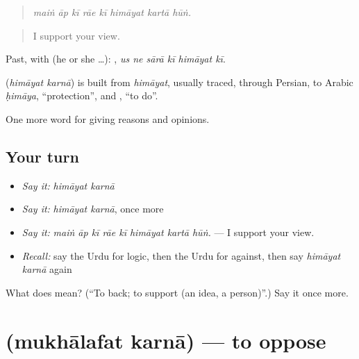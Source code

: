 \begin{quote}
\emph{maiṅ āp kī rāe kī himāyat kartā hūṅ.}
\end{quote}

\begin{quote}
I support your view.
\end{quote}

Past, with  (he or she …):      , \emph{us ne sārā kī himāyat kī}.

\begin{cousinweb}
\textbf{ } (\emph{himāyat karnā}) is built from \emph{himāyat}, usually traced, through Persian, to Arabic \emph{ḥimāya}, \textquotedblleft{}protection\textquotedblright{}, and \textbf{}, \textquotedblleft{}to do\textquotedblright{}.
\end{cousinweb}

\begin{grammarlens}[title={What you've built}]
One more word for giving reasons and opinions.
\end{grammarlens}

\subsection*{Your turn}
\begin{itemize}
\raggedright
  \item \emph{Say it:} \emph{himāyat karnā}
  \item \emph{Say it:} \emph{himāyat karnā}, once more
  \item \emph{Say it:} \emph{maiṅ āp kī rāe kī himāyat kartā hūṅ.} — I support your view.
  \item \emph{Recall:} say the Urdu for logic, then the Urdu for against, then say \emph{himāyat karnā} again
\end{itemize}

\begin{tcolorbox}[breakable,colback=teal!4,colframe=teal!35!black,title={Before you move on}]
What does   mean? (\textquotedblleft{}To back; to support (an idea, a person)\textquotedblright{}.) Say it once more.
\end{tcolorbox}
\section[\texorpdfstring{\ur{مخالفت} \ur{کرنا} (mukhālafat karnā)}{مخالفت کرنا (mukhālafat karnā)}]{  (mukhālafat karnā) — to oppose}

